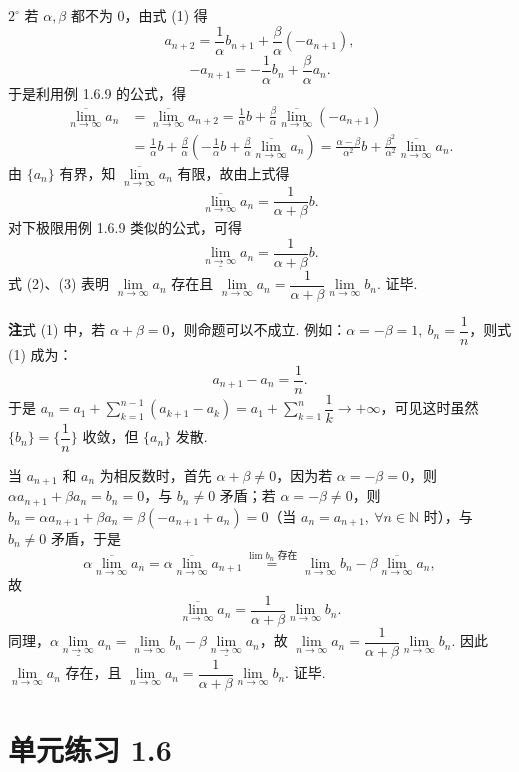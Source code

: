 \documentclass[UTF8, 12pt, fontset=fandol, oneside]{ctexart}
\begin{document}
$2^\circ$ 若 $\alpha,\beta$ 都不为 0，由式 (1) 得
\[
  a_{n+2}=\frac1{\alpha}b_{n+1}+\frac{\beta}{\alpha}(-a_{n+1}),
\]
\[
  -a_{n+1}=-\frac1{\alpha}b_n+\frac{\beta}{\alpha}a_n.
\]
于是利用例 1.6.9 的公式，得
\[
\begin{aligned}
  \overline{\lim_{n\to\infty}}a_n
  &=\overline{\lim_{n\to\infty}}a_{n+2}
   =\frac1{\alpha}b+\frac{\beta}{\alpha}\overline{\lim_{n\to\infty}}(-a_{n+1})\\
  &=\frac1{\alpha}b+\frac{\beta}{\alpha}\left(-\frac1{\alpha}b+\frac{\beta}{\alpha}\overline{\lim_{n\to\infty}}a_n\right)
   =\frac{\alpha-\beta}{\alpha^2}b+\frac{\beta^2}{\alpha^2}\overline{\lim_{n\to\infty}}a_n.
\end{aligned}
\]
由 $\{a_n\}$ 有界，知 $\overline{\lim\limits_{n\to\infty}}a_n$ 有限，故由上式得
\[
  \overline{\lim_{n\to\infty}}a_n=\frac1{\alpha+\beta}b.
\tag{2}
\]
对下极限用例 1.6.9 类似的公式，可得
\[
  \underline{\lim_{n\to\infty}}a_n=\frac1{\alpha+\beta}b.
\tag{3}
\]
式 (2)、(3) 表明 $\lim\limits_{n\to\infty}a_n$ 存在且 $\lim\limits_{n\to\infty}a_n=\dfrac1{\alpha+\beta}\lim\limits_{n\to\infty}b_n$. 证毕.

\noindent\textbf{注}\quad 式 (1) 中，若 $\alpha+\beta=0$，则命题可以不成立. 例如：$\alpha=-\beta=1,\ b_n=\dfrac1n$，则式 (1) 成为：
\[
  a_{n+1}-a_n=\frac1n.
\]
于是 $a_n=a_1+\sum\limits_{k=1}^{n-1}(a_{k+1}-a_k)=a_1+\sum\limits_{k=1}^{n}\dfrac1k\to+\infty$，可见这时虽然 $\{b_n\}=\{\dfrac1n\}$ 收敛，但 $\{a_n\}$ 发散.

当 $a_{n+1}$ 和 $a_n$ 为相反数时，首先 $\alpha+\beta\ne0$，因为若 $\alpha=-\beta=0$，则 $\alpha a_{n+1}+\beta a_n=b_n=0$，与 $b_n\ne0$ 矛盾；若 $\alpha=-\beta\ne0$，则 $b_n=\alpha a_{n+1}+\beta a_n=\beta(-a_{n+1}+a_n)=0$（当 $a_n=a_{n+1},\ \forall n\in\mathbb{N}$ 时），与 $b_n\ne0$ 矛盾，于是
\[
  \alpha\overline{\lim_{n\to\infty}}a_n
  =\alpha\overline{\lim_{n\to\infty}}a_{n+1}
  \overset{\lim b_n\text{ 存在}}{=}
  \lim_{n\to\infty}b_n-\beta\overline{\lim_{n\to\infty}}a_n,
\]
故
\[
  \overline{\lim_{n\to\infty}}a_n=\frac1{\alpha+\beta}\lim_{n\to\infty}b_n.
\]
同理，$\alpha\underline{\lim\limits_{n\to\infty}}a_n
=\lim\limits_{n\to\infty}b_n-\beta\underline{\lim\limits_{n\to\infty}}a_n$，故 $\lim\limits_{n\to\infty}a_n=\dfrac1{\alpha+\beta}\lim\limits_{n\to\infty}b_n$. 因此 $\lim\limits_{n\to\infty}a_n$ 存在，且 $\lim\limits_{n\to\infty}a_n=\dfrac1{\alpha+\beta}\lim\limits_{n\to\infty}b_n$. 证毕.

\section*{单元练习 1.6}
\end{document}
